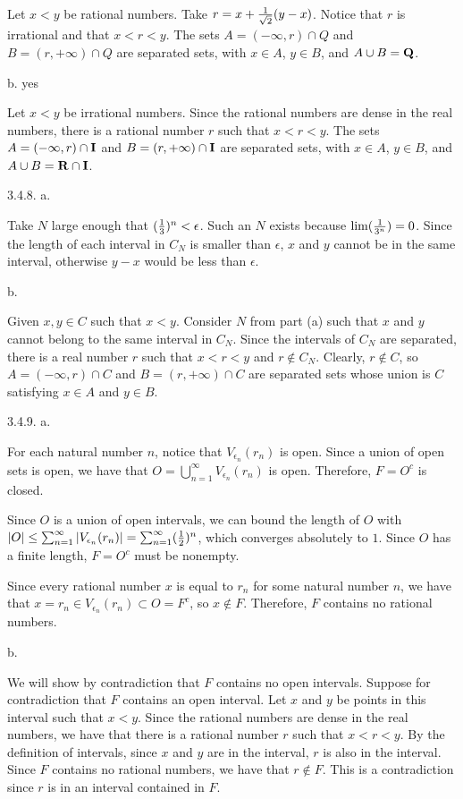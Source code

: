Let $x < y$ be rational numbers.
Take $r = x + {1 \over \sqrt 2} (y - x)$.
Notice that $r$ is irrational and that $x < r < y$.
The sets $A = (-\infty, r) \cap Q$ and $B = (r, +\infty) \cap Q$
are separated sets, with $x \in A$, $y \in B$, and $A \cup B = {\bf Q}$.
\medskip
\item{} b. yes

Let $x < y$ be irrational numbers.
Since the rational numbers are dense in the real numbers,
there is a rational number $r$ such that $x < r < y$.
The sets $A = (-\infty, r) \cap {\bf I}$ and
$B = (r, +\infty) \cap {\bf I}$ are separated sets,
with $x \in A$, $y \in B$, and $A \cup B = {\bf R} \cap {\bf I}$.
\bigskip
\item{3.4.8.} a.

Take $N$ large enough that $({1 \over 3})^n < \epsilon$.
Such an $N$ exists because $\lim ({1 \over 3^n}) = 0$.
Since the length of each interval in $C_N$ is smaller than $\epsilon$,
$x$ and $y$ cannot be in the same interval,
otherwise $y - x$ would be less than $\epsilon$.
\medskip
\item{} b.

Given $x, y \in C$ such that $x < y$.
Consider $N$ from part (a) such that $x$ and $y$
cannot belong to the same interval in $C_N$.
Since the intervals of $C_N$ are separated,
there is a real number $r$ such that $x < r < y$ and $r \notin C_N$.
Clearly, $r \notin C$,
so $A = (-\infty, r) \cap C$ and $B = (r, +\infty) \cap C$
are separated sets whose union is $C$ satisfying $x \in A$ and $y \in B$.
\bigskip
\item{3.4.9.} a.

For each natural number $n$, notice that $V _{\epsilon _n} (r_n)$ is open.
Since a union of open sets is open, we have that
$O = \bigcup _{n=1} ^\infty V _{\epsilon _n} (r_n)$ is open.
Therefore, $F = O^c$ is closed.

Since $O$ is a union of open intervals,
we can bound the length of $O$ with
$\vert O\vert \le \sum _{n=1} ^\infty \vert V _{\epsilon _n} (r_n)\vert =
\sum _{n=1} ^\infty ({1 \over 2})^n$, which converges absolutely to $1$.
Since $O$ has a finite length, $F = O^c$ must be nonempty.

Since every rational number $x$ is equal to $r_n$ for some natural number $n$,
we have that $x = r_n \in V _{\epsilon _n} (r_n) \subset O = F^c$,
so $x \notin F$.
Therefore, $F$ contains no rational numbers.
\medskip\goodbreak
\item{} b.

We will show by contradiction that $F$ contains no open intervals.
Suppose for contradiction that $F$ contains an open interval.
Let $x$ and $y$ be points in this interval such that $x < y$.
Since the rational numbers are dense in the real numbers,
we have that there is a rational number $r$ such that $x < r < y$.
By the definition of intervals, since $x$ and $y$ are in the interval,
$r$ is also in the interval.
Since $F$ contains no rational numbers, we have that $r \notin F$.
This is a contradiction since $r$ is in an interval contained in $F$.

